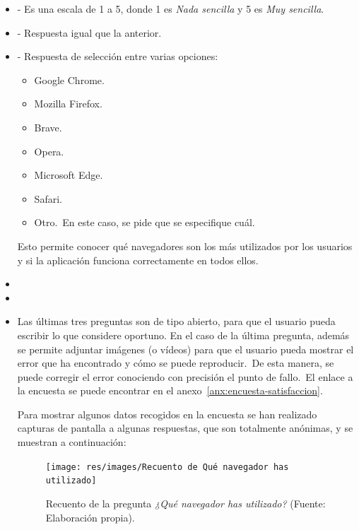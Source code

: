 \begin{itemize}
	\item {} - Es una escala de 1 a 5, donde 1 es
	\textit{Nada sencilla} y 5 es \textit{Muy sencilla}.
	\item {} - Respuesta igual que la anterior.
	\item {} - Respuesta de selección entre varias opciones:
	\begin{itemize}
		\item Google Chrome.
		\item Mozilla Firefox.
		\item Brave.
		\item Opera.
		\item Microsoft Edge.
		\item Safari.
		\item Otro.\ En este caso, se pide que se especifique cuál.
	\end{itemize}
	Esto permite conocer qué navegadores son los más utilizados por los usuarios y si la aplicación funciona
	correctamente en todos ellos.
	\item {}
	\item {}
	\item {}

	Las últimas tres preguntas son de tipo abierto, para que el usuario pueda escribir lo que considere oportuno.
	En el caso de la última pregunta, además se permite adjuntar imágenes (o vídeos) para que el usuario pueda mostrar
	el error que ha encontrado y cómo se puede reproducir.\ De esta manera, se puede corregir el error conociendo
	con precisión el punto de fallo.\ El enlace a la encuesta se puede encontrar en el
	anexo~\ref{anx:encuesta-satisfaccion}.

	Para mostrar algunos datos recogidos en la encuesta se han realizado capturas de pantalla a algunas respuestas,
	que son totalmente anónimas, y se muestran a continuación:

	\begin{figure}[h]
		\centering
		\texttt{[image: res/images/Recuento de Qué navegador has utilizado]}
		\caption{Recuento de la pregunta \textit{¿Qué navegador has utilizado?} (Fuente: Elaboración propia).}
		\label{fig:recuento-navegador}
	\end{figure}


\end{itemize}
